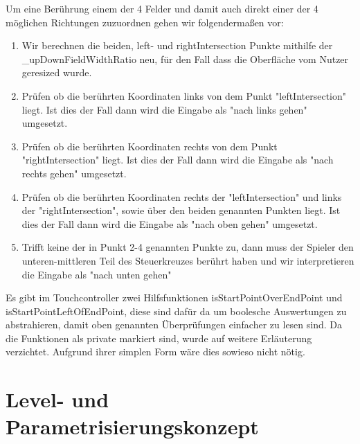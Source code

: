 \documentclass[a4paper,10pt]{report}
\begin{document}
{{			\noindent
			Um eine Berührung einem der 4 Felder und damit auch direkt einer der 4 möglichen Richtungen zuzuordnen gehen wir folgendermaßen vor:
			\newpage
			\begin{enumerate}
				\item Wir berechnen die beiden, left- und rightIntersection Punkte mithilfe der \_upDownFieldWidthRatio neu, für den Fall dass die Oberfläche vom Nutzer geresized wurde.
				\item Prüfen ob die berührten Koordinaten links von dem Punkt "leftIntersection" liegt. Ist dies der Fall dann wird die Eingabe als "nach links gehen" umgesetzt.
				\item Prüfen ob die berührten Koordinaten rechts von dem Punkt "rightIntersection" liegt. Ist dies der Fall dann wird die Eingabe als "nach rechts gehen" umgesetzt.
				\item Prüfen ob die berührten Koordinaten rechts der "leftIntersection" und links der "rightIntersection", sowie über den beiden genannten Punkten liegt. 
					  Ist dies der Fall dann wird die Eingabe als "nach oben gehen" umgesetzt.
				\item Trifft keine der in Punkt 2-4 genannten Punkte zu, dann muss der Spieler den unteren-mittleren Teil des Steuerkreuzes berührt haben und wir interpretieren die Eingabe als "nach unten gehen"
			\end{enumerate}
			\noindent
			Es gibt im Touchcontroller zwei Hilfsfunktionen isStartPointOverEndPoint und isStartPointLeftOfEndPoint, diese sind dafür da um boolesche Auswertungen zu abstrahieren, 
			damit oben genannten Überprüfungen einfacher zu lesen sind. Da die Funktionen als private markiert sind, wurde auf weitere Erläuterung verzichtet. Aufgrund ihrer simplen Form wäre dies sowieso nicht nötig.
		}    	
    	
    	
    }
  

    \newpage
    \chapter{Level- und Parametrisierungskonzept}
    
\end{document}
